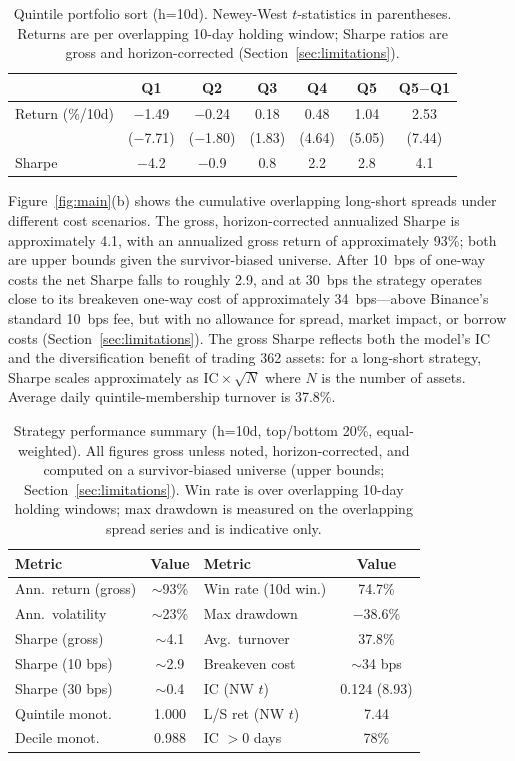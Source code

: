 \documentclass[sigconf]{acmart}
\begin{document}
\begin{table}[h]
\small
\centering
\caption{Quintile portfolio sort (h=10d). Newey-West $t$-statistics in parentheses. Returns are per overlapping 10-day holding window; Sharpe ratios are gross and horizon-corrected (Section~\ref{sec:limitations}).}
\label{tab:quintile}
\begin{tabular}{lcccccc}
\toprule
 & Q1 & Q2 & Q3 & Q4 & Q5 & Q5$-$Q1 \\
\midrule
Return (\%/10d) & $-$1.49 & $-$0.24 & 0.18 & 0.48 & 1.04 & 2.53 \\
 & ($-$7.71) & ($-$1.80) & (1.83) & (4.64) & (5.05) & (7.44) \\
Sharpe & $-$4.2 & $-$0.9 & 0.8 & 2.2 & 2.8 & 4.1 \\
\bottomrule
\end{tabular}
\end{table}

Figure~\ref{fig:main}(b) shows the cumulative overlapping long-short spreads under different cost scenarios.
The gross, horizon-corrected annualized Sharpe is approximately 4.1, with an annualized gross return of approximately 93\%; both are upper bounds given the survivor-biased universe.
After 10~bps of one-way costs the net Sharpe falls to roughly 2.9, and at 30~bps the strategy operates close to its breakeven one-way cost of approximately 34~bps---above Binance's standard 10~bps fee, but with no allowance for spread, market impact, or borrow costs (Section~\ref{sec:limitations}).
The gross Sharpe reflects both the model's IC and the diversification benefit of trading 362 assets: for a long-short strategy, Sharpe scales approximately as $\text{IC} \times \sqrt{N}$ where $N$ is the number of assets.
Average daily quintile-membership turnover is 37.8\%.

\begin{table}[h]
\small
\centering
\caption{Strategy performance summary (h=10d, top/bottom 20\%, equal-weighted). All figures gross unless noted, horizon-corrected, and computed on a survivor-biased universe (upper bounds; Section~\ref{sec:limitations}). Win rate is over overlapping 10-day holding windows; max drawdown is measured on the overlapping spread series and is indicative only.}
\label{tab:performance}
\begin{tabular}{lclc}
\toprule
Metric & Value & Metric & Value \\
\midrule
Ann.\ return (gross) & $\sim$93\% & Win rate (10d win.) & 74.7\% \\
Ann.\ volatility & $\sim$23\% & Max drawdown & $-$38.6\% \\
Sharpe (gross) & $\sim$4.1 & Avg.\ turnover & 37.8\% \\
Sharpe (10 bps) & $\sim$2.9 & Breakeven cost & $\sim$34 bps \\
Sharpe (30 bps) & $\sim$0.4 & IC (NW $t$) & 0.124 (8.93) \\
Quintile monot. & 1.000 & L/S ret (NW $t$) & 7.44 \\
Decile monot. & 0.988 & IC $>0$ days & 78\% \\
\bottomrule
\end{tabular}
\end{table}
\end{document}
